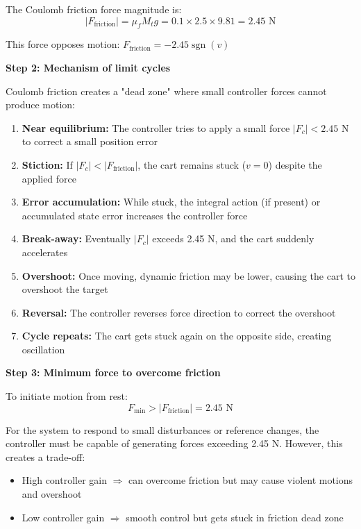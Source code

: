 \documentclass[11pt,a4paper]{article}
\begin{document}
The Coulomb friction force magnitude is:
\begin{equation}
	|F_{\text{friction}}| = \mu_f M_t g = 0.1 \times 2.5 \times 9.81 = 2.45 \text{ N}
\end{equation}

This force opposes motion: $F_{\text{friction}} = -2.45 \operatorname{sgn}(v)$

\textbf{Step 2: Mechanism of limit cycles}

Coulomb friction creates a "dead zone" where small controller forces cannot produce motion:

\begin{enumerate}
\item \textbf{Near equilibrium:} The controller tries to apply a small force $|F_c| < 2.45$ N to correct a small position error
\item \textbf{Stiction:} If $|F_c| < |F_{\text{friction}}|$, the cart remains stuck ($v = 0$) despite the applied force
\item \textbf{Error accumulation:} While stuck, the integral action (if present) or accumulated state error increases the controller force
\item \textbf{Break-away:} Eventually $|F_c|$ exceeds 2.45 N, and the cart suddenly accelerates
\item \textbf{Overshoot:} Once moving, dynamic friction may be lower, causing the cart to overshoot the target
\item \textbf{Reversal:} The controller reverses force direction to correct the overshoot
\item \textbf{Cycle repeats:} The cart gets stuck again on the opposite side, creating oscillation
\end{enumerate}

\textbf{Step 3: Minimum force to overcome friction}

To initiate motion from rest:
\begin{equation}
	F_{\text{min}} > |F_{\text{friction}}| = 2.45 \text{ N}
\end{equation}

For the system to respond to small disturbances or reference changes, the controller must be capable of generating forces exceeding 2.45 N. However, this creates a trade-off:
\begin{itemize}
\item High controller gain $\Rightarrow$ can overcome friction but may cause violent motions and overshoot
\item Low controller gain $\Rightarrow$ smooth control but gets stuck in friction dead zone
\end{itemize}
\end{document}
